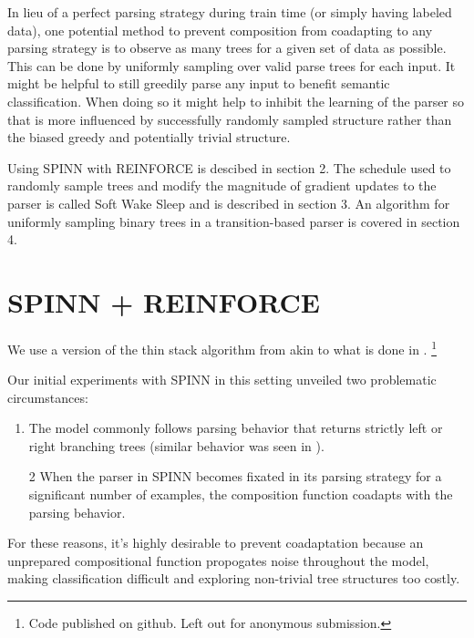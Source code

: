 \documentclass[11pt,a4paper]{article}
\begin{document}
In lieu of a perfect parsing strategy during train time (or simply having labeled data), one potential method to prevent composition from coadapting to any parsing strategy is to observe as many trees for a given set of data as possible. This can be done by uniformly sampling over valid parse trees for each input. It might be helpful to still greedily parse any input to benefit semantic classification. When doing so it might help to inhibit the learning of the parser so that is more influenced by successfully randomly sampled structure rather than the biased greedy and potentially trivial structure.

Using SPINN with REINFORCE is descibed in section 2. The schedule used to randomly sample trees and modify the magnitude of gradient updates to the parser is called Soft Wake Sleep and is described in section 3. An algorithm for uniformly sampling binary trees in a transition-based parser is covered in section 4.




\section{SPINN + REINFORCE}

We use a version of the thin stack algorithm from \citet{bowman2016fast} akin to what is done in \citet{yogatama2016learning}. \footnote{Code published on github. Left out for anonymous submission.}

Our initial experiments with SPINN in this setting unveiled two problematic circumstances:

\begin{enumerate}
\item
The model commonly follows parsing behavior that returns strictly left or right branching trees (similar behavior was seen in \citet{yogatama2016learning}).
\end{enumerate}

\begin{enumerate}
\item[2]
When the parser in SPINN becomes fixated in its parsing
strategy for a significant number of examples, the composition function coadapts with the parsing behavior.
\end{enumerate}

For these reasons, it's highly desirable to prevent coadaptation
because an unprepared compositional function propogates noise throughout the model, making
classification difficult and exploring non-trivial tree structures too costly.
\end{document}
